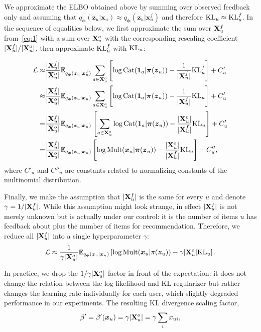 \documentclass[sigconf,authorversion]{acmart}
\def\XX{{\bf X}}
\def\bz{{\bf z}}
\def\bphi{{\boldsymbol{\phi}}}
\def\bpi{{\boldsymbol{\pi}}}
\def\bz{\boldsymbol{z}}
\def\bOne{\boldsymbol{1}}
\def\bx{\boldsymbol{x}}
\begin{document}
We approximate the ELBO obtained above by summing over observed feedback only and assuming that $q_{\bphi}(\bz_u|\bx_u) \approx q_{\bphi}(\bz_u|\bx_u^f)$ and therefore $\mathrm{KL}_u\approx\mathrm{KL}_u^f$. In the sequence of equalities below, we first approximate the sum over $\XX_u^f$ from~\eqref{eq:1} with a sum over $\XX_u^o$ with the corresponding rescaling coefficient ${|\XX_u^f|}/{|\XX_u^o|}$, then approximate $\mathrm{KL}_u^f$ with $\mathrm{KL}_u$:

\begin{equation*}\begin{aligned}
\mathcal{L} \approx &
  \frac{|\XX_u^f|}{|\XX_u^o|} \mathbb{E}_{q_{\bphi}(\bz_u|\bx_u^f)} \sum_{a \in \XX_u^o} \left[\log \mathrm{Cat}(\bOne_a|\bpi(\bz_u)) - \frac{1}{|\XX_u^f|} \klf\right] + C'_u \\
  \approx & \frac{|\XX_u^f|}{|\XX_u^o|} \mathbb{E}_{q_{\bphi}(\bz_u|\bx_u)} \sum_{a \in \XX_u^o} \left[\log \mathrm{Cat}(\bOne_a|\bpi(\bz_u)) - \frac{1}{|\XX_u^f|} \klu\right] + C'_u \\
  = & \frac{|\XX_u^f|}{|\XX_u^o|}  \mathbb{E}_{q_{\bphi}(\bz_u|\bx_u)}\left[\sum_{a \in \XX_u^o} \log \mathrm{Cat}(\bOne_a|\bpi(\bz_u)) - \frac{|\XX_u^o|}{|\XX_u^f|} \klu\right] + C'_u \\
  = & \frac{|\XX_u^f|}{|\XX_u^o|}  \mathbb{E}_{q_{\bphi}(\bz_u|\bx_u)}\left[\log \mathrm{Mult}(\bx_u|\bpi(\bz_u)) - \frac{|\XX_u^o|}{|\XX_u^f|} \klu\right] + C''_u ,
\end{aligned}
\end{equation*}
where $C'_u$ and $C''_u$ are constants related to normalizing constants of the multinomial distribution.

Finally, we make the assumption that $|\XX_u^f|$ is the same for every $u$ and denote $\gamma={1}/{|\XX_u^f|}$. While this assumption might look strange, in effect $|\XX_u^f|$ is not merely unknown but is actually under our control: it is the number of items $u$ has feedback about plus the number of items for recommendation. Therefore, we reduce all $|\XX_u^f|$ into a single hyperparameter $\gamma$:
\begin{equation}\label{eq:3}
  \mathcal{L} \approx 
  \frac{1}{\gamma|\XX_u^o|}  \mathbb{E}_{q_{\bphi}(\bz_u|\bx_u)}\left[\log \mathrm{Mult}(\bx_u|\pi(\bz_u)) - \gamma|\XX_u^o| \klu\right].
\end{equation}

\noindent
In practice, we drop the ${1}/{\gamma|\XX_u^o|}$ factor in front of the expectation: it does not change the relation between the log likelihood and KL regularizer but rather changes the learning rate individually for each user, which slightly degraded performance in our experiments.
The resulting KL divergence scaling factor, 
\begin{equation}\label{eq:beta}
    \beta'=\beta'(\bx_u) = \gamma|\XX_u^o| = \gamma \sum_i x_{ui},
\end{equation}
\end{document}
